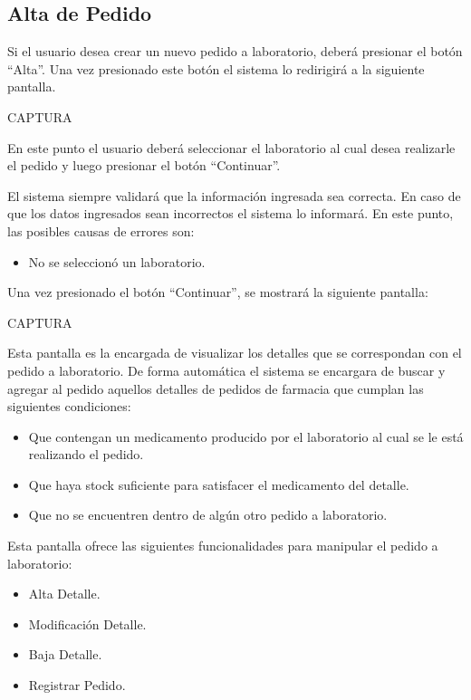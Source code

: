 \documentclass[letterpaper,10pt,spanish]{sphinxmanual}
\begin{document}
\subsection{Alta de Pedido}
\label{pedidosalab:alta-de-pedido}
Si el usuario desea crear un nuevo pedido a laboratorio, deberá presionar el botón “Alta”. Una vez presionado este botón el sistema lo redirigirá a la siguiente pantalla.

CAPTURA

En este punto el usuario deberá seleccionar el laboratorio al cual desea realizarle el pedido y luego presionar el botón “Continuar”.

El sistema siempre validará que la información ingresada sea correcta. En caso de que los datos ingresados sean incorrectos el sistema lo informará.
En este punto, las posibles causas de errores son:
\begin{itemize}
\item {} 
No se seleccionó un laboratorio.

\end{itemize}

Una vez presionado el botón “Continuar”, se mostrará la siguiente pantalla:

CAPTURA

Esta pantalla es la encargada de visualizar los detalles que se correspondan con el pedido a laboratorio.
De forma automática el sistema se encargara de buscar y agregar al pedido aquellos detalles de pedidos de farmacia que cumplan las siguientes condiciones:
\begin{itemize}
\item {} 
Que contengan un medicamento producido por el laboratorio al cual se le está realizando el pedido.

\item {} 
Que haya stock suficiente para satisfacer el medicamento del detalle.

\item {} 
Que no se encuentren dentro de algún otro pedido a laboratorio.

\end{itemize}

Esta pantalla ofrece las siguientes funcionalidades para manipular el pedido a laboratorio:
\begin{itemize}
\item {} 
Alta Detalle.

\item {} 
Modificación Detalle.

\item {} 
Baja Detalle.

\item {} 
Registrar Pedido.

\end{itemize}
\end{document}
